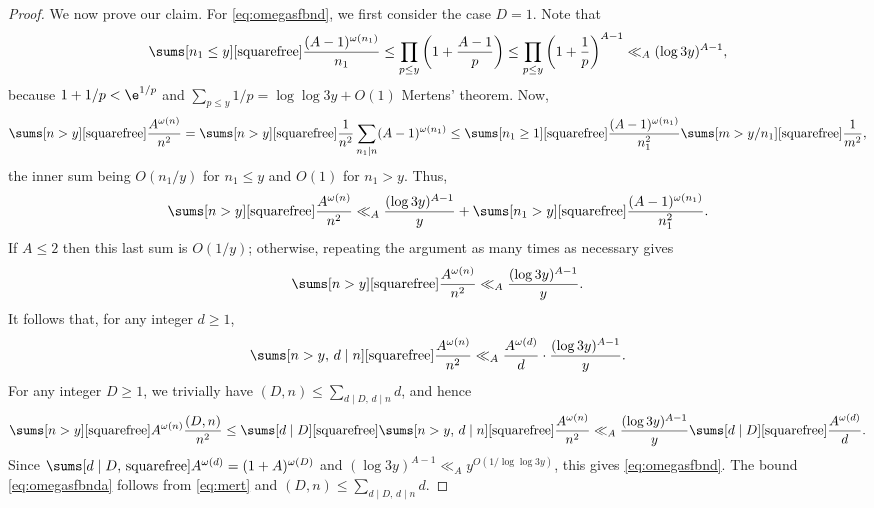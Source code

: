\documentclass[12pt, reqno, twoside, letterpaper]{amsart}
\begin{document}
\begin{proof}
We now prove our claim.
%
For \eqref{eq:omegasfbnd}, we first consider the case $D = 1$.
%
Note that   
\begin{equation}
 \label{eq:mert}
 \sums[n_1 \le y][\text{squarefree}] %
  \frac{(A - 1)^{\omega(n_1)}}{n_1}
   \le 
    \prod_{p \le y}
     \bigg(1 + \frac{A - 1}{p}\bigg)
      \le 
       \prod_{p \le y} 
        \bigg(1 + \frac{1}{p}\bigg)^{A - 1}
         \ll_A
          (\log 3y)^{A - 1},
\end{equation}
because $1 + 1/p < \e^{1/p}$ and 
$\sum_{p \le y} 1/p = \log\log 3y + O(1)$ Mertens' theorem.
%
Now, 
\[
 \sums[n > y][\text{squarefree}] %
  \frac{A^{\omega(n)}}{n^2}
  =
   \sums[n > y][\text{squarefree}] %
    \frac{1}{n^2}
     \sum_{n_1 \mid n} (A - 1)^{\omega(n_1)}
      \le 
       \sums[n_1 \ge 1][\text{squarefree}] %
        \frac{(A - 1)^{\omega(n_1)}}{n_1^2}
         \sums[m > y/n_1][\text{squarefree}] %
          \frac{1}{m^2},
\]
the inner sum being $O(n_1/y)$ for $n_1 \le y$ and $O(1)$ for 
$n_1 > y$. 
%
Thus, 
\[
 \sums[n > y][\text{squarefree}]%
  \frac{A^{\omega(n)}}{n^2}
  \ll_A
   \frac{(\log 3y)^{A - 1}}{y}
    +
     \sums[n_1 > y][\text{squarefree}] %
      \frac{(A - 1)^{\omega(n_1)}}{n_1^2}.
\]
%
If $A \le 2$ then this last sum is $O(1/y)$; otherwise, 
repeating the argument as many times as necessary gives
\[
 \sums[n > y] [\text{squarefree}] %
  \frac{A^{\omega(n)}}{n^2}
  \ll_A
   \frac{(\log 3y)^{A - 1}}{y}.
\]
%
It follows that, for any integer $d \ge 1$, 
\[
  \sums[n > y, \, d \mid n][\text{squarefree}] %
   \frac{A^{\omega(n)}}{n^2}
    \ll_A
     \frac{A^{\omega(d)}}{d}
      \cdot 
       \frac{(\log 3y)^{A - 1}}{y}.
\]
%
For any integer $D \ge 1$, we trivially have 
$(D,n) \le \sum_{d \mid D, \, d \mid n} d$, and hence
%
\[
 \sums[n > y][\text{squarefree}] %
  A^{\omega(n)} \frac{(D,n)}{n^2}
   \le 
    \sums[d \mid D][\text{squarefree}] %
     \sums[n > y, \, d \mid n][\text{squarefree}]%
      \frac{A^{\omega(n)}}{n^2} 
       \ll_A 
        \frac{(\log 3y)^{A - 1}}{y}
         \sums[d \mid D][\text{squarefree}] \frac{A^{\omega(d)}}{d}. %
\]
%
Since 
$
 \sums[d \mid D, \, \text{squarefree}] A^{\omega(d)} 
  = 
   (1 + A)^{\omega(D)}
$
and 
$(\log 3y)^{A - 1} \ll_A y^{O(1/\log\log 3y)}$, 
this gives \eqref{eq:omegasfbnd}.
%
The bound \eqref{eq:omegasfbnda} follows from \eqref{eq:mert} and 
$(D,n) \le \sum_{d \mid D, \, d \mid n} d$.


\end{proof}
\end{document}
